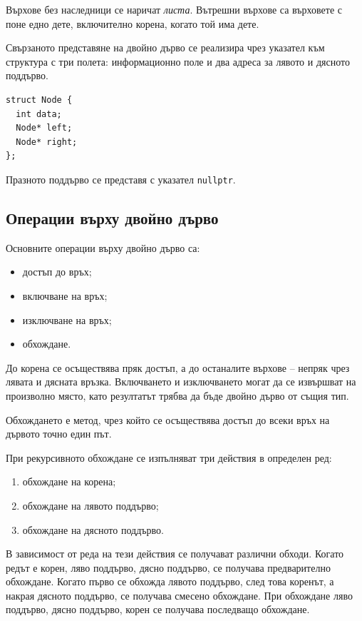 \begin{defn}
Върхове без наследници се наричат \emph{листа}. Вътрешни върхове са върховете с поне едно дете, включително корена, когато той има дете.
\end{defn}

Свързаното представяне на двойно дърво се реализира чрез указател към структура с три полета: информационно поле и два адреса за лявото и дясното поддърво.

\begin{verbatim}
struct Node {
  int data;
  Node* left;
  Node* right;
};
\end{verbatim}

Празното поддърво се представя с указател \verb|nullptr|.

\subsection{Операции върху двойно дърво}\label{s:18.6.2}

Основните операции върху двойно дърво са:

\begin{itemize}
    \item достъп до връх;
    \item включване на връх;
    \item изключване на връх;
    \item обхождане.
\end{itemize}

До корена се осъществява пряк достъп, а до останалите върхове -- непряк чрез лявата и дясната връзка. Включването и изключването могат да се извършват на произволно място, като резултатът трябва да бъде двойно дърво от същия тип.

\begin{defn}[Обхождане]
Обхождането е метод, чрез който се осъществява достъп до всеки връх на дървото точно един път.
\end{defn}

При рекурсивното обхождане се изпълняват три действия в определен ред:

\begin{enumerate}
    \item обхождане на корена;
    \item обхождане на лявото поддърво;
    \item обхождане на дясното поддърво.
\end{enumerate}

В зависимост от реда на тези действия се получават различни обходи. Когато редът е корен, ляво поддърво, дясно поддърво, се получава предварително обхождане. Когато първо се обхожда лявото поддърво, след това коренът, а накрая дясното поддърво, се получава смесено обхождане. При обхождане ляво поддърво, дясно поддърво, корен се получава последващо обхождане.

